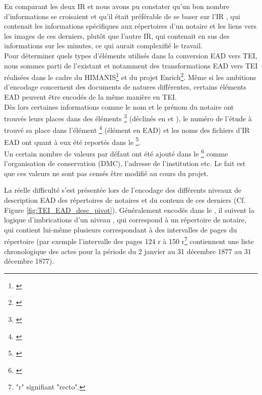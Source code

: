 En comparant les deux IR  et  nous avons pu constater qu'un bon nombre d'informations se croisaient et qu'il était préférable de se baser sur l'IR , qui contenait les informations spécifiques aux répertoires d'un notaire et les liens vers les images de ces derniers, plutôt que l'autre IR, qui contenait en sus des informations sur les minutes, ce qui aurait complexifié le travail.\\

Pour déterminer quels types d'éléments utilisés dans la conversion EAD vers TEI, nous sommes parti de l'existant et notamment des transformations EAD vers TEI réalisées dans le cadre du HIMANIS\footnote{\cite{stutzmann_ead-tei_2019}} et du projet Enrich\footnote{\cite{university_of_oxford_-__bodleian_library_ead2enrich_nodate}}. Même si les ambitions d'encodage concernent des documents de natures différentes, certains éléments EAD peuvent être encodés de la même manière en TEI.\\

Dès lors certaines informations comme le nom et le prénom du notaire ont trouvés leurs places dans des éléments \footnote{\cite{tei_tei_nodate-9}} (déclinés en  et ), le numéro de l'étude à trouvé sa place dans l'élément \footnote{\cite{tei_tei_nodate-8}} (élément  en EAD) et les noms des fichiers d'IR EAD ont quant à eux été reportés dans le \footnote{\cite{tei_tei_nodate-7}}.\\

Un certain nombre de valeurs par défaut ont été ajouté dans le \footnote{\cite{tei_tei_nodate-23}} comme l'organisation de conservation (DMC), l'adresse de l'institution etc. Le fait est que ces valeurs ne sont pas censés être modifié au cours du projet.

La réelle difficulté s'est présentée lors de l'encodage des différents niveaux de description EAD des répertoires de notaires et du contenu de ces derniers (Cf. Figure \ref{fig:TEI_EAD_desc_pivot}). Généralement encodés dans le , il suivent la logique d'imbrications d'un niveau , qui correspond à un répertoire de notaire, qui contient lui-même plusieurs  correspondant à des intervalles de pages du répertoire (par exemple l'intervalle des pages 124 r à 150 r\footnote{"r" signifiant "recto".} contiennent une liste chronologique des actes pour la période du 2 janvier au 31 décembre 1877 au 31 décembre 1877). 

